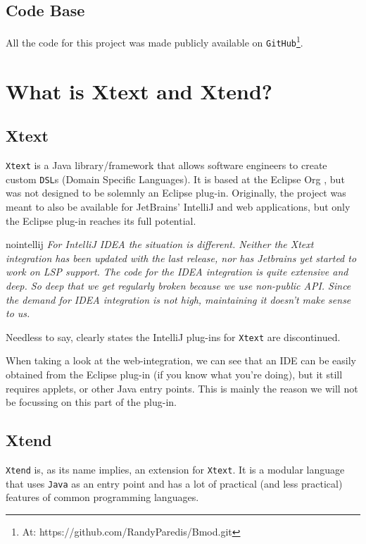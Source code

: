 \documentclass[review]{elsarticle}
\begin{document}
\subsection{Code Base}
All the code for this project was made publicly available on \texttt{GitHub}\footnote{At: https://github.com/RandyParedis/Bmod.git}.




\section{What is Xtext and Xtend?}
\label{sec:xtext}

\subsection{Xtext}
\texttt{Xtext} \cite{xtext} is a \textsf{Java} library/framework that allows software engineers to create custom \texttt{DSL}s (Domain Specific Languages). It is based at the \textsf{Eclipse Org} \cite{eclipse}, but was not designed to be solemnly an \textsf{Eclipse} plug-in. Originally, the project was meant to also be available for \textsf{JetBrains}' \textsf{IntelliJ} and web applications, but only the \textsf{Eclipse} plug-in reaches its full potential.

\begin{displaycquote}{nointellij}
	\textit{For IntelliJ IDEA the situation is different. Neither the Xtext integration has been updated with the last release, nor has Jetbrains yet started to work on LSP support. The code for the IDEA integration is quite extensive and deep. So deep that we get regularly broken because we use non-public API. Since the demand for IDEA integration is not high, maintaining it doesn’t make sense to us.}
\end{displaycquote}

Needless to say, \cite{nointellij} clearly states the \textsf{IntelliJ} plug-ins for \texttt{Xtext} are discontinued.

When taking a look at the web-integration, we can see that an \textsf{IDE} can be easily obtained from the \textsf{Eclipse} plug-in (if you know what you're doing), but it still requires applets, or other \textsf{Java} entry points. This is mainly the reason we will not be focussing on this part of the plug-in.

\subsection{Xtend}
\texttt{Xtend} is, as its name implies, an extension for \texttt{Xtext}. It is a modular language that uses \texttt{Java} as an entry point and has a lot of practical (and less practical) features of common programming languages.
\end{document}
